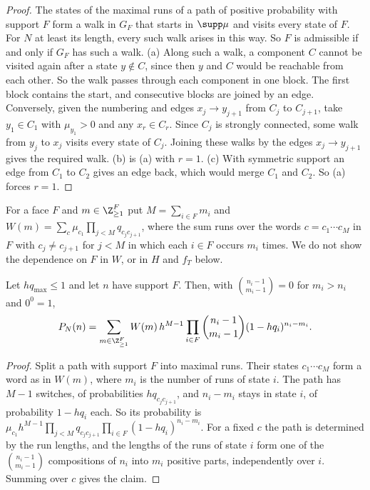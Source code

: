 \begin{proof}
The states of the maximal runs of a path of positive probability with support $F$ form a walk in
$G_F$ that starts in $\supp\mu$ and visits every state of $F$. For $N$ at least its length, every
such walk arises in this way. So $F$ is admissible if and only if $G_F$ has such a walk. (a) Along
such a walk, a component $C$ cannot be visited again after a state $y\notin C$, since then $y$ and
$C$ would be reachable from each other. So the walk passes through each component in one block.
The first block contains the start, and consecutive blocks are joined by an edge.
Conversely, given the numbering and edges $x_j\to y_{j+1}$ from $C_j$ to $C_{j+1}$, take
$y_1\in C_1$ with $\mu_{y_1}>0$ and any $x_r\in C_r$. Since $C_j$ is strongly connected, some walk
from $y_j$ to $x_j$ visits every state of $C_j$. Joining these walks by the edges
$x_j\to y_{j+1}$ gives the required walk. (b) is (a) with $r=1$. (c) With symmetric support an
edge from $C_1$ to $C_2$ gives an edge back, which would merge $C_1$ and $C_2$. So (a) forces
$r=1$.
\end{proof}

For a face $F$ and $m\in\Z_{\ge1}^F$ put $M=\sum_{i\in F}m_i$ and
$W(m)=\sum_c\mu_{c_1}\prod_{j<M}q_{c_jc_{j+1}}$, where the sum runs over the words
$c=c_1\cdots c_M$ in $F$ with $c_j\ne c_{j+1}$ for $j<M$ in which each $i\in F$ occurs $m_i$ times.
We do not show the dependence on $F$ in $W$, or in $H$ and $f_T$ below.

\begin{lemma}\label{lem:runs}
Let $hq_{\max}\le1$ and let $n$ have support $F$. Then, with $\binom{n_i-1}{m_i-1}=0$ for
$m_i>n_i$ and $0^0=1$,
\[
P_N(n)=\sum_{m\in\Z_{\ge1}^F}W(m)\,h^{M-1}\prod_{i\in F}\binom{n_i-1}{m_i-1}(1-hq_i)^{n_i-m_i}.
\]
\end{lemma}

\begin{proof}
Split a path with support $F$ into maximal runs. Their states $c_1\cdots c_M$ form a word as in
$W(m)$, where $m_i$ is the number of runs of state $i$. The path has $M-1$ switches, of
probabilities $hq_{c_jc_{j+1}}$, and $n_i-m_i$ stays in state $i$, of probability $1-hq_i$ each.
So its probability is $\mu_{c_1}h^{M-1}\prod_{j<M}q_{c_jc_{j+1}}\prod_{i\in F}(1-hq_i)^{n_i-m_i}$.
For a fixed $c$ the path is determined by the run lengths, and the lengths of the runs of state
$i$ form one of the $\binom{n_i-1}{m_i-1}$ compositions of $n_i$ into $m_i$ positive parts,
independently over $i$. Summing over $c$ gives the claim.
\end{proof}

